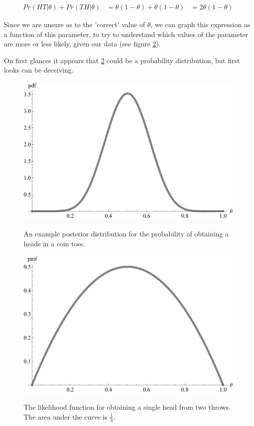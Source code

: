 \documentclass[11pt,fullpage]{book}
\begin{document}
\begin{equation}
\begin{align}
Pr(HT|\theta) + Pr(TH|\theta) &= \theta(1-\theta) + \theta(1-\theta)
&= 2\theta(1-\theta)
\end{align}
\end{equation}

Since we are unsure as to the 'correct' value of $\theta$, we can graph this expression as a function of this parameter, to try to understand which values of the parameter are more or less likely, given our data (see figure \ref{fig:Likelihood_coinLikelihood}).

On first glances it appears that \ref{fig:Likelihood_coinLikelihood} could be a probability distribution, but first looks can be deceiving. 

\begin{figure}
\centering
\scalebox{0.5} 
{\includegraphics{Likelihood_posteriorExample.pdf}}
\caption{An example posterior distribution for the probability of obtaining a heads in a coin toss.}\label{fig:Likelihood_posteriorExample}
\end{figure}

\begin{figure}
\centering
\scalebox{0.5} 
{\includegraphics{Likelihood_coinLikelihood.pdf}}
\caption{The likelihood function for obtaining a single head from two throws. The area under the curve is $\frac{1}{3}$.}\label{fig:Likelihood_coinLikelihood}
\end{figure}
\end{document}
